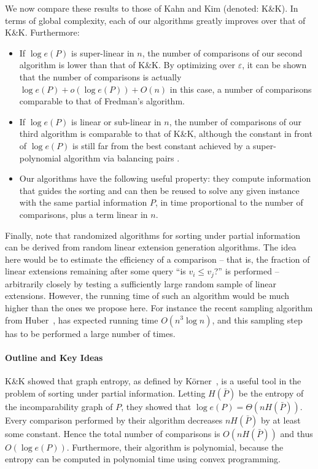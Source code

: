 \documentclass{article} \usepackage{fullpage}
\begin{document}
We now compare these results to those of Kahn and Kim (denoted: K\&K). In terms of global complexity, each of our algorithms greatly improves over that of K\&K. Furthermore:

\begin{itemize}
\item If $\log e(P)$ is super-linear in $n$, the number of comparisons of our second algorithm is lower than that of K\&K. By optimizing over $\varepsilon$, it can be shown that the number of comparisons is actually $\log e(P) + o(\log e(P)) + O(n)$ in this case, a number of comparisons comparable to that of Fredman's algorithm. 

\item If $\log e(P)$ is linear or sub-linear in $n$, the number of comparisons of our third algorithm is comparable to that of K\&K, although the constant in front of $\log e(P)$ is still far from the best constant achieved by a super-polynomial algorithm via balancing pairs \cite{BFT95,B99}.

\item Our algorithms have the following useful property: they compute information that guides the sorting and can then be reused to solve any given instance with the same partial information $P$, in time proportional to the number of comparisons, plus a term linear in $n$.
\end{itemize}

Finally, note that randomized algorithms for sorting under partial information can be derived from random linear extension generation algorithms. The idea here would be to estimate the efficiency of a comparison -- that is, the fraction of linear extensions remaining after some query ``is $v_i \leqslant v_j$?'' is performed -- arbitrarily closely by testing a sufficiently large random sample of linear extensions. However, the running time of such an algorithm would be much higher than the ones we propose here. For instance the recent sampling algorithm from Huber~\cite{H06}, has expected running time $O(n^3\log n)$, and this sampling step has to be performed a large number of times.

\paragraph*{Outline and Key Ideas}

K\&K showed that graph entropy, as defined by K\"orner~\cite{K73}, is a useful tool in the problem of sorting under partial information. Letting $H(\bar{P})$ be the entropy of the incomparability graph of $P$, they showed that $\log e(P) = \Theta(nH(\bar{P}))$. Every comparison performed by their algorithm decreases $n H(\bar{P})$ by at least some constant. Hence the total number of comparisons is $O(nH(\bar{P}))$ and thus $O(\log e(P))$. Furthermore, their algorithm is polynomial, because the entropy can be computed in polynomial time using convex programming.
\end{document}
